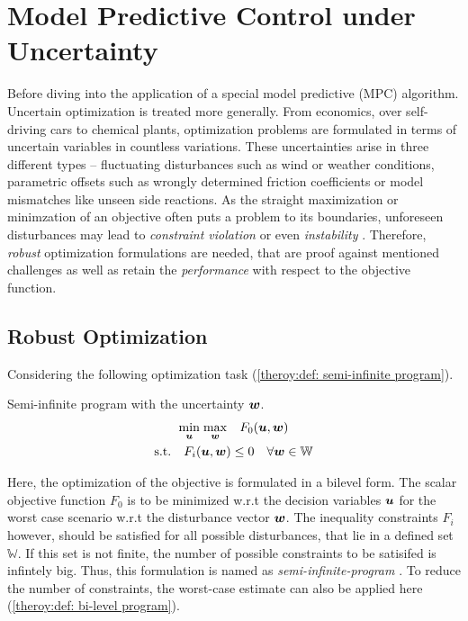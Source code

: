 \chapter{Model Predictive Control under Uncertainty}


Before diving into the application of a special model predictive (MPC) algorithm. Uncertain
optimization is treated more generally. From economics, over self-driving cars to chemical plants,
optimization problems are formulated in terms of uncertain variables in countless variations.
These uncertainties arise in three different types – fluctuating disturbances such as wind or weather conditions,
parametric offsets such as wrongly determined friction coefficients or model mismatches like unseen side reactions.
As the straight maximization or minimzation of an objective often puts a problem to its boundaries,
unforeseen disturbances may lead to \emph{constraint violation} or even \emph{instability} \cite{houska2011}.
Therefore, \emph{robust} optimization formulations are needed, that are proof against mentioned challenges as
well as retain the \emph{performance} with respect to the objective function.
\newline

\section{Robust Optimization}

Considering the following optimization task (\ref{theroy:def: semi-infinite program}).
\begin{definition} Semi-infinite program with the uncertainty ${\bm{w}}$.
    \label{theroy:def: semi-infinite program}
    \[
    \begin{gathered}
        \underset{{\bm{u}}}{\min} \; \underset{{\bm{w}}}{\max} \quad F_0({\bm{u}}, {\bm{w}}) \\
        \text{s.t.} \quad F_i({\bm{u}}, {\bm{w}}) \leq 0 \quad \forall {\bm{w}} \in \mathbb{W}
    \end{gathered}
    \]
\end{definition}

Here, the optimization of the objective is formulated in a bilevel form. The scalar objective function $F_0$ is to 
be minimized w.r.t the decision variables ${\bm{u}}$ for the worst case scenario w.r.t the disturbance
vector ${\bm{w}}$. The inequality constraints $F_i$ however, should be satisfied for all possible disturbances, that
lie in a defined set $\mathbb{W}$. If this set is not finite, the number of possible 
constraints to be satisifed is infintely big. Thus, this formulation is named as \emph{semi-infinite-program} \cite{houska2011}.
To reduce the number of constraints, the worst-case estimate can also be applied here (\ref{theroy:def: bi-level program}). 

